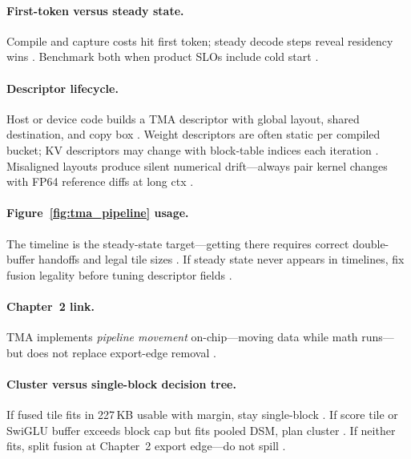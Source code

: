 \paragraph{First-token versus steady state.}
Compile and capture costs hit first token; steady decode steps reveal residency wins \citep{nvidia2024cudagraphs,kwon2023vllm,taxbreak2026}.
Benchmark both when product SLOs include cold start \citep{patel2025llminference,memoryfloor2026}.

\paragraph{Descriptor lifecycle.}
Host or device code builds a TMA descriptor with global layout, shared destination, and copy box \citep{nvidia2022hopper,semianalysis2024tma}.
Weight descriptors are often static per compiled bucket; KV descriptors may change with block-table indices each iteration \citep{kwon2023vllm,yirage2026}.
Misaligned layouts produce silent numerical drift---always pair kernel changes with FP64 reference diffs at long ctx \citep{dao2023flashdecoding}.

\paragraph{Figure~\ref{fig:tma_pipeline} usage.}
The timeline is the steady-state target---getting there requires correct double-buffer handoffs and legal tile sizes \citep{semianalysis2024tma,yirage2026,dao2022flashattention}.
If steady state never appears in timelines, fix fusion legality before tuning descriptor fields \citep{patel2025llminference,memoryfloor2026}.

\paragraph{Chapter~2 link.}
TMA implements \emph{pipeline movement} on-chip---moving data while math runs---but does not replace export-edge removal \citep{chen2020compilerbasedhardw,memoryfloor2026}.

\paragraph{Cluster versus single-block decision tree.}
If fused tile fits in 227\,KB usable with margin, stay single-block \citep{nvidia2022hopper,yirage2026}.
If score tile or SwiGLU buffer exceeds block cap but fits pooled DSM, plan cluster \citep{semianalysis2024tma,dao2023flashdecoding}.
If neither fits, split fusion at Chapter~2 export edge---do not spill \citep{memoryfloor2026,chen2020compilerbasedhardw,taxbreak2026}.


